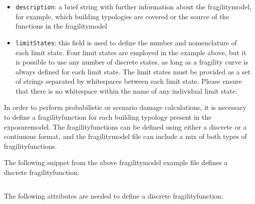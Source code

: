 \begin{itemize}

    \item \Verb+description+: a brief string with further information about the
    \gls{fragilitymodel}, for example, which building typologies are covered or 
    the source of the functions in the \gls{fragilitymodel}

    \item \Verb+limitStates+: this field is used to define the number and 
    nomenclature of each limit state. Four limit states are employed in the 
    example above, but it is possible to use any number of discrete states,
    as long as a fragility curve is always defined for each limit state. The 
    limit states must be provided as a set of strings separated by whitespaces 
    between each limit state. Please ensure that there is no whitespace within 
    the name of any individual limit state.

\end{itemize}

In order to perform probabilistic or scenario damage calculations, it is
necessary to define a \gls{fragilityfunction} for each building typology present in
the \gls{exposuremodel}. The \glspl{fragilityfunction} can be defined using either a
discrete or a continuous format, and the \gls{fragilitymodel} file can include a
mix of both types of \glspl{fragilityfunction}.

The following snippet from the above \gls{fragilitymodel} example file defines a
discrete \gls{fragilityfunction}:

\inputminted[firstline=11,firstnumber=11,lastline=17,fontsize=\footnotesize,frame=single,linenos,bgcolor=lightgray]{xml}{oqum/risk/Verbatim/input_fragility.xml}

The following attributes are needed to define a discrete \gls{fragilityfunction}:

